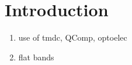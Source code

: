 \section{Introduction}
\begin{enumerate}
    \item use of tmdc, QComp, optoelec
    \item flat bands
\end{enumerate}
